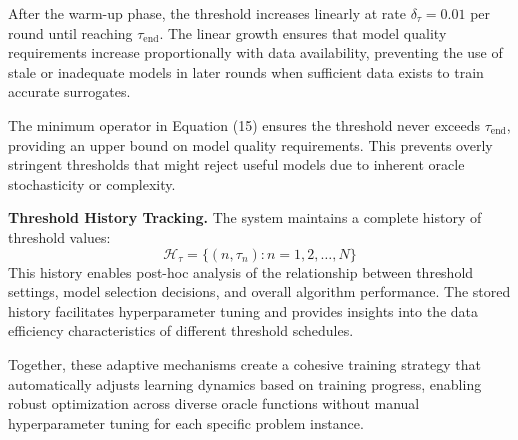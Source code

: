 After the warm-up phase, the threshold increases linearly at rate $\delta_{\tau} = 0.01$ per round until reaching $\tau_{\text{end}}$. The linear growth ensures that model quality requirements increase proportionally with data availability, preventing the use of stale or inadequate models in later rounds when sufficient data exists to train accurate surrogates.

The minimum operator in Equation (15) ensures the threshold never exceeds $\tau_{\text{end}}$, providing an upper bound on model quality requirements. This prevents overly stringent thresholds that might reject useful models due to inherent oracle stochasticity or complexity.

\textbf{Threshold History Tracking.} The system maintains a complete history of threshold values:
%
\begin{equation}
\mathcal{H}_{\tau} = \{(n, \tau_n) : n = 1, 2, \ldots, N\}
\end{equation}
%
This history enables post-hoc analysis of the relationship between threshold settings, model selection decisions, and overall algorithm performance. The stored history facilitates hyperparameter tuning and provides insights into the data efficiency characteristics of different threshold schedules.

Together, these adaptive mechanisms create a cohesive training strategy that automatically adjusts learning dynamics based on training progress, enabling robust optimization across diverse oracle functions without manual hyperparameter tuning for each specific problem instance.
